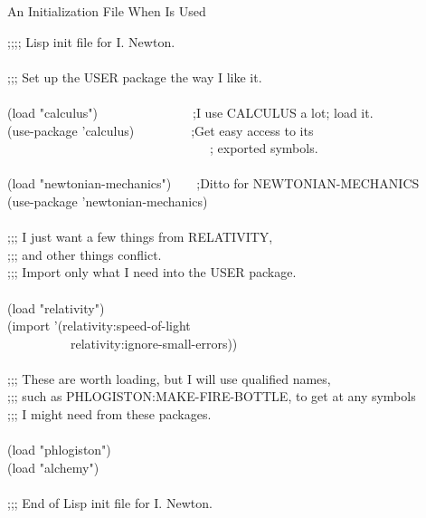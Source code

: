 \begin{table}[t]
\caption{An Initialization File When \protect{} Is Used}
\label{DEFPACKAGE-INIT-FILE-TABLE}
\begin{lisp}
;;;; Lisp init file for I. Newton. \\
 \\
;;; Set up the USER package the way I like it. \\
 \\
(load "calculus")~~~~~~~~~~~~~~~;I use CALCULUS a lot; load it. \\
(use-package 'calculus)~~~~~~~~~;Get easy access to its \\
~~~~~~~~~~~~~~~~~~~~~~~~~~~~~~~~; exported symbols. \\
 \\
(load "newtonian-mechanics")~~~~;Ditto for NEWTONIAN-MECHANICS \\
(use-package 'newtonian-mechanics) \\
 \\
;;; I just want a few things from RELATIVITY, \\
;;; and other things conflict. \\
;;; Import only what I need into the USER package. \\
 \\
(load "relativity") \\
(import '(relativity:speed-of-light \\
~~~~~~~~~~relativity:ignore-small-errors)) \\
 \\
;;; These are worth loading, but I will use qualified names, \\
;;; such as PHLOGISTON:MAKE-FIRE-BOTTLE, to get at any symbols \\
;;; I might need from these packages. \\
 \\
(load "phlogiston") \\
(load "alchemy") \\
 \\
;;; End of Lisp init file for I. Newton.
\end{lisp}
\end{table}
